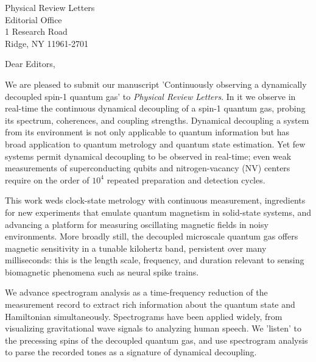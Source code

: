 \documentclass[10pt,letterpaper]{letter} %
\begin{document}

\begin{letter}{
	Physical Review Letters\\
	Editorial Office\\
	1 Research Road \\
	Ridge, NY 11961-2701\\
}


\opening{Dear Editors,}

We are pleased to submit our manuscript 'Continuously observing a dynamically decoupled spin-1 quantum gas' to \textit{Physical Review Letters}.
In it we observe in real-time the continuous dynamical decoupling of a spin-1 quantum gas, probing its spectrum, coherences, and coupling strengths.
Dynamical decoupling a system from its environment is not only applicable to quantum information but has broad application to quantum metrology and quantum state estimation.
Yet few systems permit dynamical decoupling to be observed in real-time; even weak measurements of superconducting qubits and nitrogen-vacancy (NV) centers require on the order of $10^4$ repeated preparation and detection cycles.

This work weds clock-state metrology with continuous measurement, ingredients for new experiments that emulate quantum magnetism in solid-state systems, and advancing a platform for measuring oscillating magnetic fields in noisy environments.
More broadly still, the decoupled microscale quantum gas offers magnetic sensitivity in a tunable kilohertz band, persistent over many milliseconds: this is the length scale, frequency, and duration relevant to sensing biomagnetic phenomena such as neural spike trains.

We advance spectrogram analysis as a time-frequency reduction of the measurement record to extract rich information about the quantum state and Hamiltonian simultaneously.
Spectrograms have been applied widely, from visualizing gravitational wave signals to analyzing human speech.
We 'listen' to the precessing spins of the decoupled quantum gas, and use spectrogram analysis to parse the recorded tones as a signature of dynamical decoupling.


\end{letter}
\end{document}

